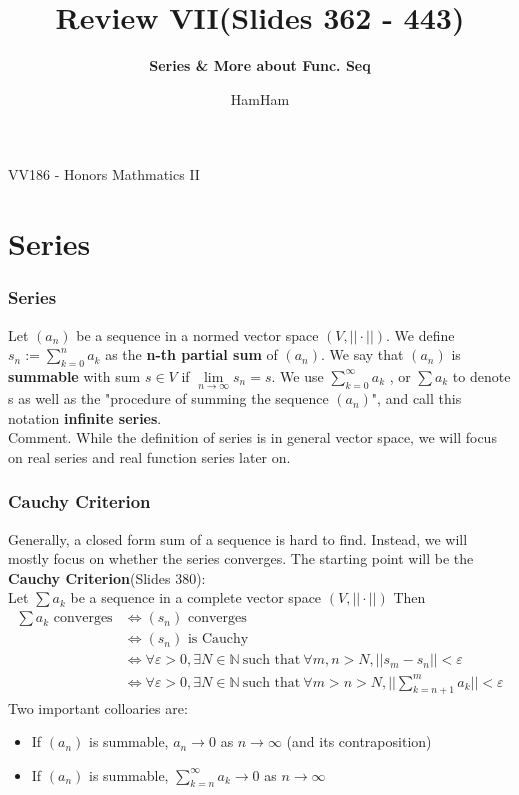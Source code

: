 \documentclass{beamer}
\title{\sffamily Review VII(Slides 362 - 443)}
\subtitle{\textbf{Series \& More about Func. Seq}\\ }
\institute[UM-SJTU JI]{University of Michigan-Shanghai Jiao Tong University Joint Institute}
\author{HamHam}
\newcommand{\myfont}{\rmfamily\normalsize\upshape\mdseries}
\begin{document}
\begin{titlepage}
    \begin{center}
        VV186 - Honors Mathmatics II
    \end{center}
\end{titlepage}
\myfont


\section{Series}


\begin{frame}
    \frametitle{Series}
    \hspace{1em}
    Let $(a_n)$ be a sequence in a normed vector space $(V, ||\cdot||)$. 
    We define $s_n:= \sum_{k=0}^n a_k$  as the \textbf{n-th partial sum} of $(a_n)$. 
    We say that $(a_n)$ is \textbf{summable} with sum $s \in V$ if $\underset{n\to\infty}{\lim}⁡ s_n=s$. 
    We use $\sum_{k=0}^\infty a_k$  , or $∑a_k$ to denote s as well as 
    the "procedure of summing the sequence $(a_n)$", 
    and call this notation \textbf{infinite series}.
    \\
    \vspace{1em}
    Comment. While the definition of series is in general vector space, we will focus on real series and real function series later on. 
\end{frame}

\begin{frame}
    \frametitle{Cauchy Criterion}
    \hspace{1em}
    Generally, a closed form sum of a sequence is hard to find. Instead, we
will mostly focus on whether the series converges.
The starting point will be the \textbf{Cauchy Criterion}(Slides 380):\\
\hspace{1em}Let $\sum a_k$ be a sequence in a complete vector space $(V, ||\cdot||)$ Then  
	\begin{align*}
        \sum a_k \text{ converges}
        &\Leftrightarrow (s_n ) \text{ converges} \\
	    &\Leftrightarrow (s_n) \text{ is Cauchy}\\
	    &\Leftrightarrow \forall \varepsilon>0, \exists N \in \mathbb{N} ~\text{such that}~ \forall m,n>N, ||s_m-s_n ||<\varepsilon\\
	    &\Leftrightarrow \forall \varepsilon>0, \exists N \in \mathbb{N}~ \text{such that}~ \forall m>n>N, ||\sum_{k=n+1}^m a_k ||<\varepsilon 
    \end{align*} 
    \pause
    Two important colloaries are:
        \begin{itemize}
            \item  If $(a_n)$ is summable, $a_n\to 0$ as $n\to \infty$ (and its contraposition)
            \item  If $(a_n)$ is summable, $\sum_{k=n}^\infty a_k\to 0$ as $n \to \infty$
        \end{itemize}
\end{frame}
\end{document}
